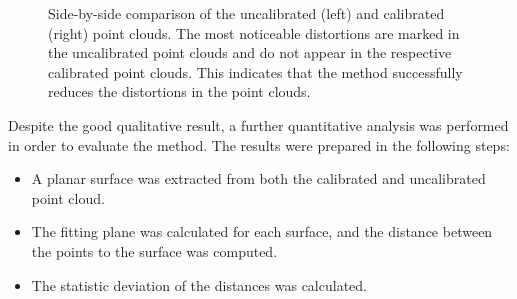 \documentclass[conference]{IEEEtran}
\begin{document}
\begin{figure}
    \centering
     \qquad

    \caption{Side-by-side comparison of the uncalibrated (left) and calibrated (right) point clouds. The most noticeable distortions are marked in the uncalibrated point clouds and do not appear in the respective calibrated point clouds. This indicates that the method successfully reduces the distortions in the point clouds.}
    \label{figure:visual-comparison}
\end{figure}

Despite the good qualitative result, a further quantitative analysis was performed in order to evaluate the method. The results were prepared in the following steps:

\begin{itemize}
    \item A planar surface was extracted from both the calibrated and uncalibrated point cloud.
    \item The fitting plane was calculated for each surface, and the distance between the points to the surface was computed.
    \item The statistic deviation of the distances was calculated.
\end{itemize}
\end{document}
